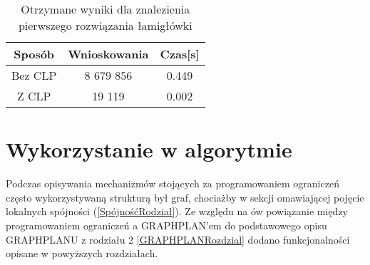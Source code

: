     \begin{table}[H]
        \centering
         \begin{tabular}{||c | c | c||} 
         \hline
         Sposób & Wnioskowania & Czas[s] \\ [0.5ex] 
         \hline\hline
         Bez CLP & 8 679 856 & 0.449 \\ 
         \hline
         Z CLP & 19 119 & 0.002  \\ [1ex]
         \hline
         \end{tabular}
         \caption{Otrzymane wyniki dla znalezienia pierwszego rozwiązania łamigłówki}
    \end{table}

\section{Wykorzystanie w algorytmie}

    Podczas opisywania mechanizmów stojących za programowaniem ograniczeń często wykorzystywaną strukturą był graf, chociażby w sekcji omawiającej 
    pojęcie lokalnych spójności (\ref{SpójnośćRodział}). Ze względu na ów powiązanie między programowaniem ograniczeń a GRAPHPLAN'em do podstawowego opisu GRAPHPLANU z rodziału 2 
    \ref{GRAPHPLANRozdzial} dodano funkcjonalności opisane w powyższych rozdziałach. 

